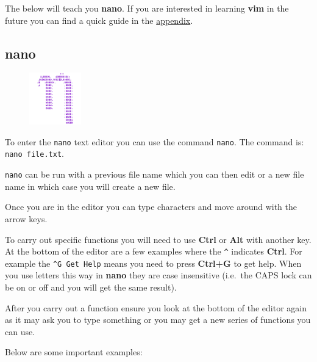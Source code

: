 \documentclass[
  letterpaper,
  DIV=11,
  numbers=noendperiod]{scrreprt}
\begin{document}
The below will teach you \textbf{nano}. If you are interested in
learning \textbf{vim} in the future you can find a quick guide in the
\protect\hyperlink{vim}{appendix}.

\hypertarget{nano}{%
\subsection{nano}\label{nano}}

\begin{figure}

{\centering \includegraphics[width=0.2\textwidth,height=\textheight]{figures/1200px-Gnu-nano.png}

}

\end{figure}

To enter the \texttt{nano} text editor you can use the command
\texttt{nano}. The command is: \texttt{nano\ file.txt}.

\texttt{nano} can be run with a previous file name which you can then
edit or a new file name in which case you will create a new file.

Once you are in the editor you can type characters and move around with
the arrow keys.

To carry out specific functions you will need to use \textbf{Ctrl} or
\textbf{Alt} with another key. At the bottom of the editor are a few
examples where the \texttt{\^{}} indicates \textbf{Ctrl}. For example
the \texttt{\^{}G\ Get\ Help} means you need to press \textbf{Ctrl+G} to
get help. When you use letters this way in \textbf{nano} they are case
insensitive (i.e.~the CAPS lock can be on or off and you will get the
same result).

After you carry out a function ensure you look at the bottom of the
editor again as it may ask you to type something or you may get a new
series of functions you can use.

Below are some important examples:
\end{document}
